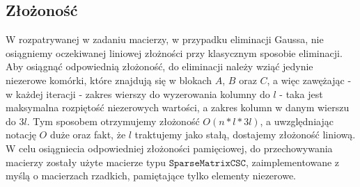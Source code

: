 \subsection{Złożoność}
W rozpatrywanej w zadaniu macierzy, w przypadku eliminacji Gaussa, nie osiągniemy oczekiwanej liniowej złożności przy klasycznym sposobie eliminacji. Aby osiągnąć odpowiednią złożoność, do eliminacji należy wziąć jedynie niezerowe komórki, które znajdują się w blokach $ A $, $ B $ oraz $ C $, a więc zawężając - w każdej iteracji - zakres wierszy do wyzerowania kolumny do $ l $ - taka jest maksymalna rozpiętość niezerowych wartości, a zakres kolumn w danym wierszu do $ 3l $. Tym sposobem otrzymujemy złożoność $ O(n * l * 3l) $, a uwzględniając notację $O$ duże oraz fakt, że $l$ traktujemy jako stałą, dostajemy złożoność liniową.
W celu osiągniecia odpowiedniej złożoności pamięciowej, do przechowywania macierzy zostały użyte macierze typu $\texttt{SparseMatrixCSC}$, zaimplementowane z myślą o macierzach rzadkich, pamiętające tylko elementy niezerowe.